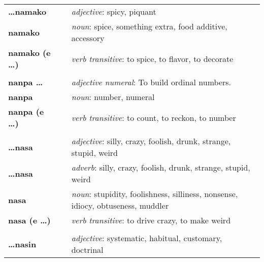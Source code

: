 \begin{supertabular}{p{2,5cm}|ll}
    \textbf{\dots namako}        &  & \textit{adjective}: spicy, piquant                                                                         \\
    \textbf{namako}              &  & \textit{noun}: spice, something extra, food additive, accessory                                            \\
    \textbf{namako (e \dots)}    &  & \textit{verb transitive}: to spice, to flavor, to decorate                                                 \\
                                 &  &                                                                                                            \\
    \textbf{nanpa \dots}         &  & \textit{adjective numeral}: To build ordinal numbers.                                                      \\
    \textbf{nanpa}               &  & \textit{noun}: number, numeral                                                                             \\
    \textbf{nanpa (e \dots)}     &  & \textit{verb transitive}: to count, to reckon,  to number                                                  \\
                                 &  &                                                                                                            \\
    \textbf{\dots nasa}          &  & \textit{adjective}: silly, crazy, foolish, drunk, strange, stupid, weird                                   \\
    \textbf{\dots nasa}          &  & \textit{adverb}: silly, crazy, foolish, drunk, strange, stupid, weird                                      \\
    \textbf{nasa}                &  & \textit{noun}: stupidity, foolishness, silliness, nonsense, idiocy, obtuseness, muddler                    \\
    \textbf{nasa (e \dots)}      &  & \textit{verb transitive}: to drive crazy, to make weird                                                    \\
                                 &  &                                                                                                            \\
    \textbf{\dots nasin}         &  & \textit{adjective}: systematic, habitual, customary, doctrinal                                             \\

\end{supertabular}
